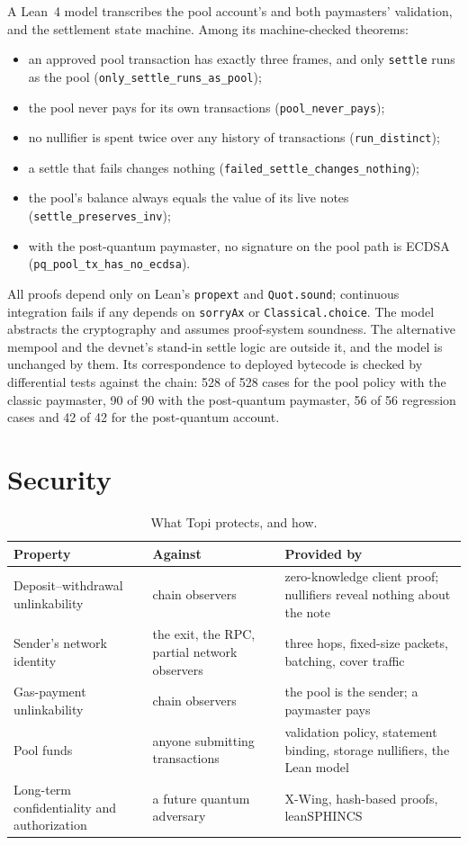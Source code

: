 \documentclass[11pt,a4paper]{article}
\newcommand{\code}[1]{\texttt{\small #1}}
\begin{document}
A Lean~4 model transcribes the pool account's and both paymasters' validation, and the settlement state
machine. Among its machine-checked theorems:
\begin{itemize}[before=\raggedright]
  \item an approved pool transaction has exactly three frames, and only \code{settle} runs as the pool
    (\code{only\_settle\_runs\_as\_pool});
  \item the pool never pays for its own transactions (\code{pool\_never\_pays});
  \item no nullifier is spent twice over any history of transactions (\code{run\_distinct});
  \item a settle that fails changes nothing (\code{failed\_settle\_changes\_nothing});
  \item the pool's balance always equals the value of its live notes (\code{settle\_preserves\_inv});
  \item with the post-quantum paymaster, no signature on the pool path is ECDSA
    (\code{pq\_pool\_tx\_has\_no\_ecdsa}).
\end{itemize}
All proofs depend only on Lean's \code{propext} and \code{Quot.sound}; continuous integration fails if
any depends on \code{sorryAx} or \code{Classical.choice}. The model abstracts the cryptography and
assumes proof-system soundness. The alternative mempool and the devnet's stand-in settle logic are
outside it, and the model is unchanged by them. Its correspondence to deployed bytecode is checked by
differential tests
against the chain: 528 of 528 cases for the pool policy with the classic paymaster, 90 of 90 with the
post-quantum paymaster, 56 of 56 regression cases and 42 of 42 for the post-quantum account.

\section{Security}

\begin{table}[ht]
\centering\small
\begin{tabularx}{\linewidth}{@{}>{\raggedright}p{3.9cm}>{\raggedright}p{3.6cm}X@{}}
\toprule
Property & Against & Provided by \\
\midrule
Deposit--withdrawal unlinkability & chain observers & zero-knowledge client proof; nullifiers reveal nothing about the note \\
Sender's network identity & the exit, the RPC, partial network observers & three hops, fixed-size packets, batching, cover traffic \\
Gas-payment unlinkability & chain observers & the pool is the sender; a paymaster pays \\
Pool funds & anyone submitting transactions & validation policy, statement binding, storage nullifiers, the Lean model \\
Long-term confidentiality and authorization & a future quantum adversary & X-Wing, hash-based proofs, leanSPHINCS \\
\bottomrule
\end{tabularx}
\caption{What Topi protects, and how.}
\end{table}
\end{document}
